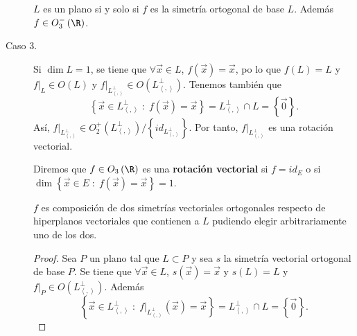 \begin{description}
\begin{itemize}
	\end{itemize}
\begin{ftheorem}[]
\normalfont  $\displaystyle L $ es un plano si y solo si $\displaystyle f $ es la simetría ortogonal de base $\displaystyle L $. Además $\displaystyle f \in O^{-}_{3}\left(\R\right) $.
\end{ftheorem}
\item[Caso 3.] Si $\displaystyle \dim L = 1 $, se tiene que $\displaystyle \forall \vec{x} \in L $, $\displaystyle f\left(\vec{x}\right) = \vec{x} $, po lo que $\displaystyle f\left(L\right) = L $ y $\displaystyle f|_{L} \in O\left(L\right) $ y $\displaystyle f|_{L^{\perp }_{\left\langle ,  \right\rangle }} \in O\left(L^{\perp }_{\left\langle ,  \right\rangle }\right) $. Tenemos también que 
	\[ \left\{ \vec{x} \in L^{\perp }_{\left\langle ,  \right\rangle } \; : \; f\left(\vec{x}\right) = \vec{x}\right\} = L^{\perp }_{\left\langle ,  \right\rangle }\cap L = \left\{ \vec{0}\right\}  .\]
	Así, $\displaystyle f|_{L^{\perp }_{\left\langle ,  \right\rangle }} \in O^{+}_{2}\left(L^{\perp }_{\left\langle ,  \right\rangle }\right) / \left\{ id _{L^{\perp }_{\left\langle ,  \right\rangle }}\right\}  $. Por tanto, $\displaystyle f|_{L^{\perp }_{\left\langle ,  \right\rangle }} $ es una rotación vectorial.
	\begin{fdefinition}
		\normalfont Diremos que $\displaystyle f \in O_{3}\left(\R\right) $ es una \textbf{rotación vectorial} si $\displaystyle f = id _{E} $ o si $\displaystyle \dim \left\{ \vec{x} \in E \; : \; f\left(\vec{x}\right) = \vec{x}\right\} = 1 $. 
	\end{fdefinition}
	\begin{ftheorem}[]
	\normalfont $\displaystyle f $ es composición de dos simetrías vectoriales ortogonales respecto de hiperplanos vectoriales que contienen a $\displaystyle L $ pudiendo elegir arbitrariamente uno de los dos.
	\end{ftheorem}
	\begin{proof}
	Sea $\displaystyle P $ un plano tal que $\displaystyle L \subset P $ y sea $\displaystyle s $ la simetría vectorial ortogonal de base $\displaystyle P $. Se tiene que $\displaystyle \forall \vec{x} \in L $, $\displaystyle s\left(\vec{x}\right)=\vec{x} $ y $\displaystyle s\left(L\right) = L $ y $\displaystyle f|_{P} \in O\left(L^{\perp }_{\left\langle ,  \right\rangle }\right) $. Además
	\[ \left\{ \vec{x} \in L^{\perp }_{\left\langle ,  \right\rangle } \; : \; f|_{L^{\perp }_{\left\langle ,  \right\rangle }}\left(\vec{x}\right) = \vec{x}\right\} = L^{\perp }_{\left\langle ,  \right\rangle }\cap L = \left\{ \vec{0}\right\}.\]

\end{proof}
\end{description}
